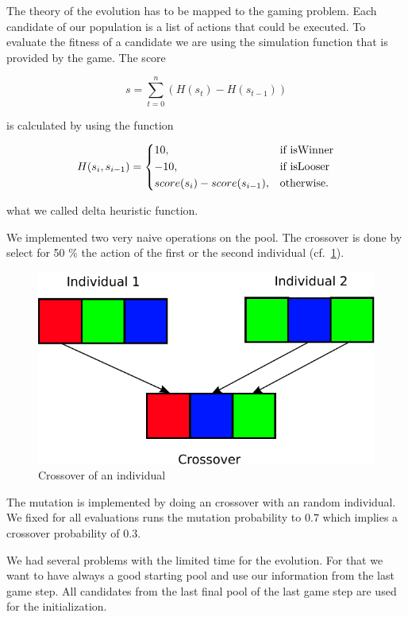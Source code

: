 The theory of the evolution has to be mapped to the gaming problem. Each candidate of our population is
a list of actions that could be executed. To evaluate the fitness of a candidate we are using the
simulation function that is provided by the game. 
The score

\begin{equation}
s = \sum_{t=0}^n (H(s_t) - H(s_{t-1}))
\end{equation}

is calculated by using the function

\begin{equation}
    H(s_i, s_{i-1}) = 
\begin{dcases}
    10, & \text{if isWinner}  \\
    -10, & \text{if isLooser}  \\
    score(s_i) - score(s_{i-1}), & \text{otherwise.}
\end{dcases}
\end{equation}

what we called delta heuristic function.

We implemented two very naive operations on the pool. The crossover is done by
select for 50 \% the action of the first or the second individual (cf.~\cref{fig:crossover}).

\begin{figure}[H]
\centering
\includegraphics[scale=0.6]{images/crossover.pdf}
\caption{Crossover of an individual}
\label{fig:crossover}
\end{figure}

The mutation is implemented by doing an crossover with an random individual.
We fixed for all evaluations runs the mutation probability to $0.7$ which implies a crossover 
probability of $0.3$.

We had several problems with the limited time for the evolution.
For that we want to have always a good starting pool and use our information from the last
game step. All candidates from the last final pool of the last game step are used for the initialization.



